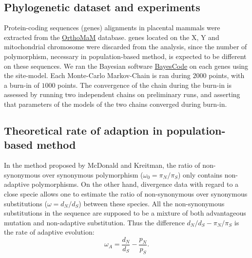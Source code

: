 \documentclass{article}
\newcommand{\dn}{d_N}
\newcommand{\ds}{d_S}
\newcommand{\dnds}{\dn / \ds}
\newcommand{\pn}{\pi_N}
\newcommand{\ps}{\pi_S}
\newcommand{\pnps}{\pn / \ps}
\begin{document}
\subsection*{Phylogenetic dataset and experiments}
Protein-coding sequences (genes) alignments in placental mammals were extracted from the \href{http://www.orthomam.univ-montp2.fr}{OrthoMaM} database\cite{ranwez_orthomam_2007, douzery_orthomam_2014, scornavacca_orthomam_2019}.
genes located on the X, Y and mitochondrial chromosome were discarded from the analysis, since the number of polymorphism, necessary in population-based method, is expected to be different on these sequences.
We ran the Bayesian software \href{https://github.com/bayesiancook/bayescode}{BayesCode} on each genes using the site-model\cite{lartillot_phylobayes_2013, rodrigue_detecting_2016}.
Each Monte-Carlo Markov-Chain is ran during $2000$ points, with a burn-in of $1000$ points.
The convergence of the chain during the burn-in is assessed by running two independent chains on preliminary runs, and asserting that parameters of the models of the two chains converged during burn-in.

\subsection*{Theoretical rate of adaption in population-based method}
In the method proposed by McDonald and Kreitman\cite{mcdonald_adaptative_1991}, the ratio of non-synonymous over synonymous polymorphism ($\omega_{0}=\pnps$) only contains non-adaptive polymorphisms.
On the other hand, divergence data with regard to a close specie allows one to estimate the ratio of non-synonymous over synonymous substitutions ($\omega=\dnds$) between these species.
All the non-synonymous substitutions in the sequence are supposed to be a mixture of both advantageous mutation and non-adaptive substitution.
Thus the difference $\dnds - \pnps$ is the rate of adaptive evolution:
\begin{equation*}
	\omega_A=\dfrac{d_N}{d_S} - \dfrac{p_N}{p_S}.
\end{equation*}
\end{document}
